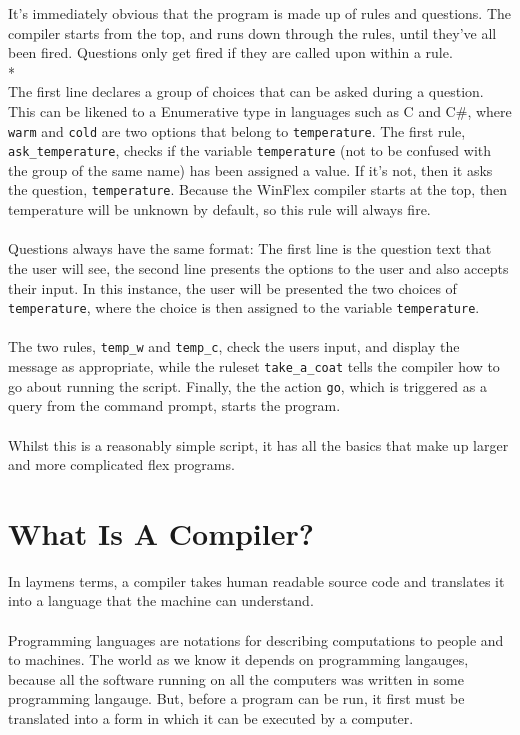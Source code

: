 \documentclass[12pt]{report}
\begin{document}
It's immediately obvious that the program is made up of rules and questions.  The compiler starts from the top, and runs down through the rules, until they've all been fired.  Questions only get fired if they are called upon within a rule.\\*
\\
The first line declares a group of choices that can be asked during a question.  This can be likened to a Enumerative type in languages such as C and C\#, where \texttt{warm} and \texttt{cold} are two options that belong to \texttt{temperature}.  The first rule, \texttt{ask\_temperature}, checks if the variable \texttt{temperature} (not to be confused with the group of the same name) has been assigned a value.  If it's not, then it asks the question, \texttt{temperature}.  Because the WinFlex compiler starts at the top, then temperature will be unknown by default, so this rule will always fire.\\
\\
Questions always have the same format: The first line is the question text that the user will see, the second line presents the options to the user and also accepts their input.  In this instance, the user will be presented the two choices of \texttt{temperature}, where the choice is then assigned to the variable \texttt{temperature}.\\
\\
The two rules, \texttt{temp\_w} and \texttt{temp\_c}, check the users input, and display the message as appropriate, while the ruleset \texttt{take\_a\_coat} tells the compiler how to go about running the script.  Finally, the the action \texttt{go}, which is triggered as a query from the command prompt, starts the program.\\
\\
Whilst this is a reasonably simple script, it has all the basics that make up larger and more complicated flex programs.

\section{What Is A Compiler?}\label{sec:what_is_a_compiler}
In laymens terms, a compiler takes human readable source code and translates it into a language that the machine can understand.\\
\\
Programming languages are notations for describing computations to people and to machines.  The world as we know it depends on programming langauges, because all the software running on all the computers was written in some programming langauge.  But, before a program can be run, it first must be translated into a form in which it can be executed by a computer.
\end{document}
